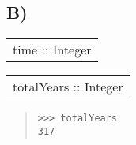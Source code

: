 \subsection{B)}
\begin{haddockdesc}
\item[\begin{tabular}{@{}l}
time :: Integer
\end{tabular}]
\end{haddockdesc}
\begin{haddockdesc}
\item[\begin{tabular}{@{}l}
totalYears :: Integer
\end{tabular}]
{\haddockbegindoc
\begin{quote}
{\haddockverb\begin{verbatim}
>>> totalYears
317

\end{verbatim}}
\end{quote}}
\end{haddockdesc}
